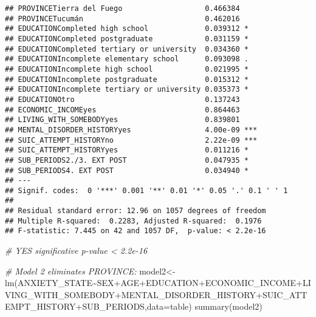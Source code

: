 \documentclass[
]{book}
\newenvironment{Shaded}{\begin{snugshade}}{\end{snugshade}}
\newcommand{\AttributeTok}[1]{\textcolor[rgb]{0.77,0.63,0.00}{#1}}
\newcommand{\CommentTok}[1]{\textcolor[rgb]{0.56,0.35,0.01}{\textit{#1}}}
\newcommand{\FunctionTok}[1]{\textcolor[rgb]{0.00,0.00,0.00}{#1}}
\newcommand{\NormalTok}[1]{#1}
\newcommand{\OtherTok}[1]{\textcolor[rgb]{0.56,0.35,0.01}{#1}}
\newcommand{\SpecialCharTok}[1]{\textcolor[rgb]{0.00,0.00,0.00}{#1}}
\begin{document}
\begin{verbatim}
## PROVINCETierra del Fuego                   0.466384    
## PROVINCETucumán                            0.462016    
## EDUCATIONCompleted high school             0.039312 *  
## EDUCATIONCompleted postgraduate            0.031159 *  
## EDUCATIONCompleted tertiary or university  0.034360 *  
## EDUCATIONIncomplete elementary school      0.093098 .  
## EDUCATIONIncomplete high school            0.021995 *  
## EDUCATIONIncomplete postgraduate           0.015312 *  
## EDUCATIONIncomplete tertiary or university 0.035373 *  
## EDUCATIONOtro                              0.137243    
## ECONOMIC_INCOMEyes                         0.864463    
## LIVING_WITH_SOMEBODYyes                    0.839801    
## MENTAL_DISORDER_HISTORYyes                 4.00e-09 ***
## SUIC_ATTEMPT_HISTORYno                     2.22e-09 ***
## SUIC_ATTEMPT_HISTORYyes                    0.011216 *  
## SUB_PERIODS2./3. EXT POST                  0.047935 *  
## SUB_PERIODS4. EXT POST                     0.034940 *  
## ---
## Signif. codes:  0 '***' 0.001 '**' 0.01 '*' 0.05 '.' 0.1 ' ' 1
## 
## Residual standard error: 12.96 on 1057 degrees of freedom
## Multiple R-squared:  0.2283, Adjusted R-squared:  0.1976 
## F-statistic: 7.445 on 42 and 1057 DF,  p-value: < 2.2e-16
\end{verbatim}

\begin{Shaded}
\begin{Highlighting}[]
\CommentTok{\# YES significative p{-}value \textless{} 2.2e{-}16}

\CommentTok{\# Model 2 eliminates PROVINCE:}
\NormalTok{model2}\OtherTok{\textless{}{-}}\FunctionTok{lm}\NormalTok{(ANXIETY\_STATE}\SpecialCharTok{\textasciitilde{}}\NormalTok{SEX}\SpecialCharTok{+}\NormalTok{AGE}\SpecialCharTok{+}\NormalTok{EDUCATION}\SpecialCharTok{+}\NormalTok{ECONOMIC\_INCOME}\SpecialCharTok{+}\NormalTok{LIVING\_WITH\_SOMEBODY}\SpecialCharTok{+}\NormalTok{MENTAL\_DISORDER\_HISTORY}\SpecialCharTok{+}\NormalTok{SUIC\_ATTEMPT\_HISTORY}\SpecialCharTok{+}\NormalTok{SUB\_PERIODS,}\AttributeTok{data=}\NormalTok{table)}
\FunctionTok{summary}\NormalTok{(model2)}
\end{Highlighting}
\end{Shaded}
\end{document}
